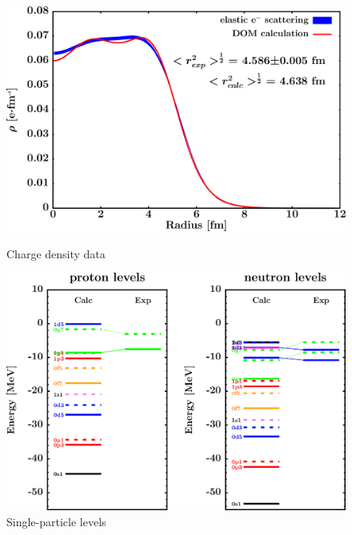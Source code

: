 \begin{figure}[H]
    \centering
    \begin{minipage}{0.45\textwidth}
        \centering
        \includegraphics[width=1.0\textwidth]{figures/sn112_chargeDensity.png}
        \caption{Charge density data}
        \label{DOMFitData_sn112_chargeDensity}
    \end{minipage}\hfill
    \begin{minipage}{0.45\textwidth}
        \centering
        \includegraphics[width=1.0\textwidth]{figures/sn112_SPLevels.png}
        \caption{Single-particle levels}
        \label{DOMFitData_sn112_SPLevels}
    \end{minipage}
\end{figure}

\afterpage{\clearpage}

